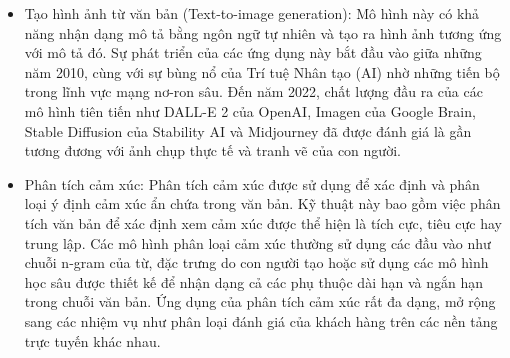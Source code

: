 \begin{itemize}
    \item Tạo hình ảnh từ văn bản (Text-to-image generation): Mô hình này có khả năng nhận dạng mô tả bằng ngôn ngữ tự nhiên và tạo ra hình ảnh tương ứng với mô tả đó. Sự phát triển của các ứng dụng này bắt đầu vào giữa những năm 2010, cùng với sự bùng nổ của Trí tuệ Nhân tạo (AI) nhờ những tiến bộ trong lĩnh vực mạng nơ-ron sâu. Đến năm 2022, chất lượng đầu ra của các mô hình tiên tiến như DALL-E 2 của OpenAI, Imagen của Google Brain, Stable Diffusion của Stability AI và Midjourney đã được đánh giá là gần tương đương với ảnh chụp thực tế và tranh vẽ của con người.
    \item Phân tích cảm xúc: Phân tích cảm xúc được sử dụng để xác định và phân loại ý định cảm xúc ẩn chứa trong văn bản. Kỹ thuật này bao gồm việc phân tích văn bản để xác định xem cảm xúc được thể hiện là tích cực, tiêu cực hay trung lập. Các mô hình phân loại cảm xúc thường sử dụng các đầu vào như chuỗi n-gram của từ, đặc trưng do con người tạo hoặc sử dụng các mô hình học sâu được thiết kế để nhận dạng cả các phụ thuộc dài hạn và ngắn hạn trong chuỗi văn bản. Ứng dụng của phân tích cảm xúc rất đa dạng, mở rộng sang các nhiệm vụ như phân loại đánh giá của khách hàng trên các nền tảng trực tuyến khác nhau.
\end{itemize}